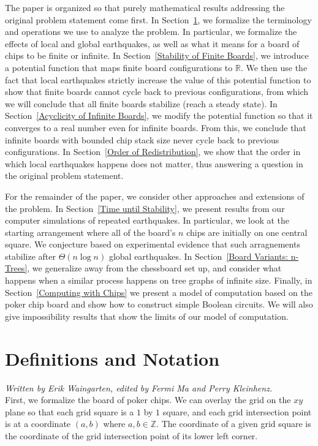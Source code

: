 \documentclass[runningheads,a4paper]{llncs}
\begin{document}
The paper is organized so that purely mathematical results addressing the original problem statement come first. In Section~\ref{Definitions and Notation}, we formalize the terminology and operations we use to analyze the problem. In particular, we formalize the effects of local and global earthquakes, as well as what it means for a board of chips to be finite or infinite. In Section~\ref{Stability of Finite Boards}, we introduce a potential function that maps finite board configurations to $\mathbb{R}$. We then use the fact that local earthquakes strictly increase the value of this potential function to show that finite boards cannot cycle back to previous configurations, from which we will conclude that all finite boards stabilize (reach a steady state). In Section~\ref{Acyclicity of Infinite Boards}, we modify the potential function so that it converges to a real number even for infinite boards. From this, we conclude that infinite boards with bounded chip stack size never cycle back to previous configurations. In Section~\ref{Order of Redistribution}, we show that the order in which local earthquakes happens does not matter, thus answering a question in the original problem statement.

For the remainder of the paper, we consider other approaches and extensions of the problem. In  Section~\ref{Time until Stability}, we present results from our computer simulations of repeated earthquakes. In particular, we look at the starting arrangement where all of the board's $n$ chips are initially on one central square. We conjecture based on experimental evidence that such arragnements stabilize after $\Theta(n \log n)$ global earthquakes. In Section~\ref{Board Variants: n-Trees}, we generalize away from the chessboard set up, and consider what happens when a similar process happens on tree graphs of infinite size. Finally, in Section~\ref{Computing with Chips} we present a model of computation based on the poker chip board and show how to construct simple Boolean circuits. We will also give impossibility results that show the limits of our model of computation.
\section{Definitions and Notation}
\label{Definitions and Notation}

\emph{Written by Erik Waingarten, edited by Fermi Ma and Perry Kleinhenz.}\\

First, we formalize the board of poker chips. We can overlay the grid on the $xy$ plane so that each grid square is a $1$ by $1$ square, and each grid intersection point is at a coordinate $(a,b)$ where $a,b \in \mathbb{Z}$. The coordinate of a given grid square is the coordinate of the grid intersection point of its lower left corner. 
\end{document}
